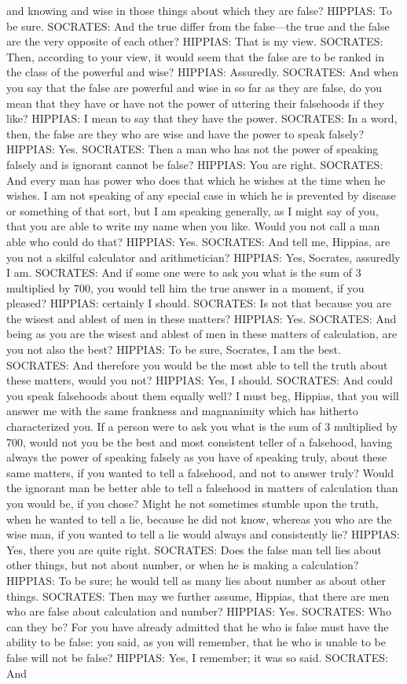 \documentclass[11pt,letter]{article}
\begin{document}
and knowing and wise in those things about which they are false? HIPPIAS:  To be sure. SOCRATES:  And the true differ from the false—the true and the false are the very opposite of each other? HIPPIAS:  That is my view. SOCRATES:  Then, according to your view, it would seem that the false are to be ranked in the class of the powerful and wise? HIPPIAS:  Assuredly. SOCRATES:  And when you say that the false are powerful and wise in so far as they are false, do you mean that they have or have not the power of uttering their falsehoods if they like? HIPPIAS:  I mean to say that they have the power. SOCRATES:  In a word, then, the false are they who are wise and have the power to speak falsely? HIPPIAS:  Yes. SOCRATES:  Then a man who has not the power of speaking falsely and is ignorant cannot be false? HIPPIAS:  You are right. SOCRATES:  And every man has power who does that which he wishes at the time when he wishes. I am not speaking of any special case in which he is prevented by disease or something of that sort, but I am speaking generally, as I might say of you, that you are able to write my name when you like. Would you not call a man able who could do that? HIPPIAS:  Yes. SOCRATES:  And tell me, Hippias, are you not a skilful calculator and arithmetician? HIPPIAS:  Yes, Socrates, assuredly I am. SOCRATES:  And if some one were to ask you what is the sum of 3 multiplied by 700, you would tell him the true answer in a moment, if you pleased? HIPPIAS:  certainly I should. SOCRATES:  Is not that because you are the wisest and ablest of men in these matters? HIPPIAS:  Yes. SOCRATES:  And being as you are the wisest and ablest of men in these matters of calculation, are you not also the best? HIPPIAS:  To be sure, Socrates, I am the best. SOCRATES:  And therefore you would be the most able to tell the truth about these matters, would you not? HIPPIAS:  Yes, I should. SOCRATES:  And could you speak falsehoods about them equally well? I must beg, Hippias, that you will answer me with the same frankness and magnanimity which has hitherto characterized you. If a person were to ask you what is the sum of 3 multiplied by 700, would not you be the best and most consistent teller of a falsehood, having always the power of speaking falsely as you have of speaking truly, about these same matters, if you wanted to tell a falsehood, and not to answer truly? Would the ignorant man be better able to tell a falsehood in matters of calculation than you would be, if you chose? Might he not sometimes stumble upon the truth, when he wanted to tell a lie, because he did not know, whereas you who are the wise man, if you wanted to tell a lie would always and consistently lie? HIPPIAS:  Yes, there you are quite right. SOCRATES:  Does the false man tell lies about other things, but not about number, or when he is making a calculation? HIPPIAS:  To be sure; he would tell as many lies about number as about other things. SOCRATES:  Then may we further assume, Hippias, that there are men who are false about calculation and number? HIPPIAS:  Yes. SOCRATES:  Who can they be? For you have already admitted that he who is false must have the ability to be false:  you said, as you will remember, that he who is unable to be false will not be false? HIPPIAS:  Yes, I remember; it was so said. SOCRATES:  And 
\end{document}
